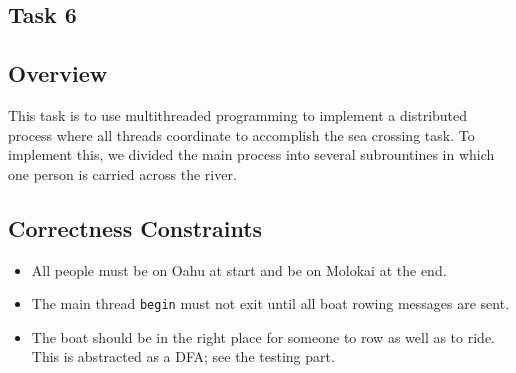 \documentclass{article}
\begin{document}
\begin{spacing}{1.1}
\section{Task 6}
\subsection{Overview}
This task is to use multithreaded programming to implement a distributed process where all threads coordinate to accomplish the sea crossing task. To implement this, we divided the main process into several subrountines in which one person is carried across the river.

\subsection{Correctness Constraints}
\begin{itemize}
  \item All people must be on Oahu at start and be on Molokai at the end.
  \item The main thread \texttt{begin} must not exit until all boat rowing messages are sent.
  \item The boat should be in the right place for someone to row as well as to ride. This is abstracted as a DFA; see the testing part.
\end{itemize}

\end{spacing}
\end{document}
